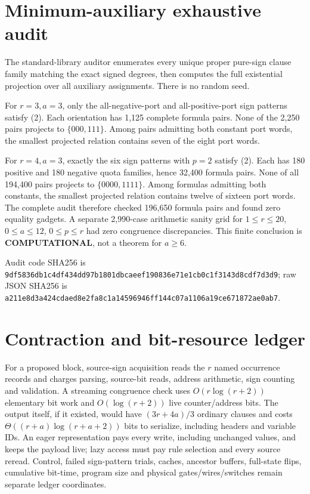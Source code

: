 \documentclass[11pt]{article}
\begin{document}
\section{Minimum-auxiliary exhaustive audit}
The standard-library auditor enumerates every unique proper pure-sign clause
family matching the exact signed degrees, then computes the full existential
projection over all auxiliary assignments.  There is no random seed.

For $r=3,a=3$, only the all-negative-port and all-positive-port sign patterns
satisfy (2).  Each orientation has 1,125 complete formula pairs.  None of the
2,250 pairs projects to $\{000,111\}$.  Among pairs admitting both constant
port words, the smallest projected relation contains seven of the eight port
words.

For $r=4,a=3$, exactly the six sign patterns with $p=2$ satisfy (2).  Each has
180 positive and 180 negative quota families, hence 32,400 formula pairs.
None of all 194,400 pairs projects to $\{0000,1111\}$.  Among formulas
admitting both constants, the smallest projected relation contains twelve of
sixteen port words.  The complete audit therefore checked 196,650 formula
pairs and found zero equality gadgets.  A separate 2,990-case arithmetic
sanity grid for $1\le r\le20$, $0\le a\le12$, $0\le p\le r$ had zero
congruence discrepancies.  This finite conclusion is \textbf{COMPUTATIONAL},
not a theorem for $a\ge6$.

Audit code SHA256 is
\texttt{9df5836db1c4df434dd97b1801dbcaeef190836e71e1cb0c1f3143d8cdf7d3d9};
raw JSON SHA256 is
\texttt{a211e8d3a424cdaed8e2fa8c1a14596946ff144c07a1106a19ce671872ae0ab7}.

\section{Contraction and bit-resource ledger}
For a proposed block, source-sign acquisition reads the $r$ named occurrence
records and charges parsing, source-bit reads, address arithmetic, sign
counting and validation.  A streaming congruence check uses
$O(r\log(r+2))$ elementary bit work and $O(\log(r+2))$ live counter/address
bits.  The output itself, if it existed, would have
$(3r+4a)/3$ ordinary clauses and costs
$\Theta((r+a)\log(r+a+2))$ bits to serialize, including headers and variable
IDs.  An eager representation pays every write, including unchanged values,
and keeps the payload live; lazy access must pay rule selection and every
source reread.  Control, failed sign-pattern trials, caches, ancestor buffers,
full-state flips, cumulative bit-time, program size and physical
gates/wires/switches remain separate ledger coordinates.
\end{document}
